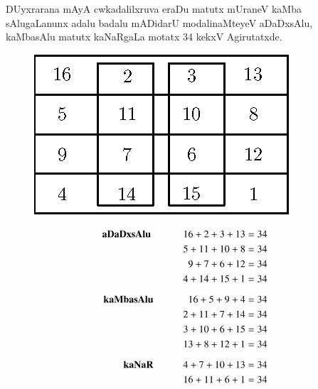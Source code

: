 DUyxrarana mAyA cwkadalilxruva eraDu matutx mUraneV kaMba sAlugaLanunx adalu badalu mADidarU modalinaMteyeV aDaDxsAlu, kaMbasAlu matutx kaNaRgaLa motatx {\rm 34} kekxV Agirutatxde.

\begin{figure}[H]
\centering
\includegraphics[scale=.8]{src/figures/m_125.eps}
\end{figure}

\begin{alignat*}{3}
\text{\bf aDaDxsAlu }\qquad  && 16+2+3+13&=34\\
&&5+11+10+8&=34\\
&&9+7+6+12&=34\\
&&4+14+15+1&=34\\[0.2cm]
\text{\bf kaMbasAlu} \qquad  &&16+5+9+4 &=34\\
&&2+11+7+14&=34\\
&&3+10+6+15&=34\\
&&13+8+12+1&=34\\[0.2cm]
\text{\bf kaNaR} \qquad  &&4+7+10+13 &=34\\
&&16+11+6+1&=34\\
\end{alignat*}
